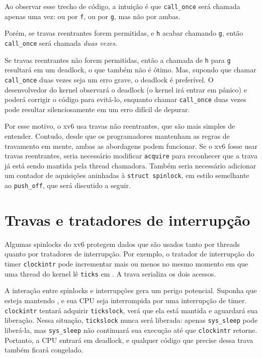Ao observar esse trecho de código, a intuição é que
\lstinline{call_once} será chamada
apenas uma vez: ou por \lstinline{f}, ou por \lstinline{g}, mas não por
ambas.

Porém, se travas reentrantes forem permitidas, e \lstinline{h} acabar chamando
\lstinline{g}, então \lstinline{call_once}
será chamada \emph{duas vezes}.

Se travas reentrantes não forem permitidas, então a chamada de
\lstinline{h} para \lstinline{g}
resultará em um deadlock, o que também não é ótimo. Mas,
supondo que chamar \lstinline{call_once}
duas vezes seja um erro grave, o deadlock
é preferível. O desenvolvedor do kernel observará o deadlock (o
kernel irá entrar em pânico) e poderá corrigir o código para evitá-lo, enquanto
chamar \lstinline{call_once} duas vezes pode
resultar silenciosamente em um erro difícil de depurar.

Por esse motivo, o xv6 usa travas não reentrantes, que são mais simples de entender.
Contudo, desde que os programadores mantenham as regras de travamento em mente,
ambas as abordagens podem funcionar. Se o xv6 fosse usar
travas reentrantes, seria necessário modificar \lstinline{acquire} para
reconhecer que a trava já está sendo mantida pela thread chamadora. Também
seria necessário adicionar um contador de aquisições aninhadas à \lstinline{struct spinlock},
em estilo semelhante ao \lstinline{push_off}, que será discutido a seguir.

\section{Travas e tratadores de interrupção}
\label{s:lockinter}

Algumas spinlocks do xv6 protegem dados que são usados tanto por
threads quanto por tratadores de interrupção.
Por exemplo, o tratador de interrupção do timer
\lstinline{clockintr}
pode incrementar
mais ou menos no mesmo momento em que uma thread do kernel
lê
\lstinline{ticks} 
em
.
A trava
serializa os dois acessos.

A interação entre spinlocks e interrupções gera um perigo potencial.
Suponha que
esteja mantendo
,
e sua CPU seja interrompida por uma interrupção de timer.
\lstinline{clockintr}
tentará adquirir
\lstinline{tickslock},
verá que ela está mantida e aguardará sua liberação.
Nessa situação,
\lstinline{tickslock}
nunca será liberada: apenas
\lstinline{sys_sleep}
pode liberá-la, mas
\lstinline{sys_sleep}
não continuará sua execução até que
\lstinline{clockintr}
retorne.
Portanto, a CPU entrará em deadlock, e qualquer código
que precise dessa trava também ficará congelado.

